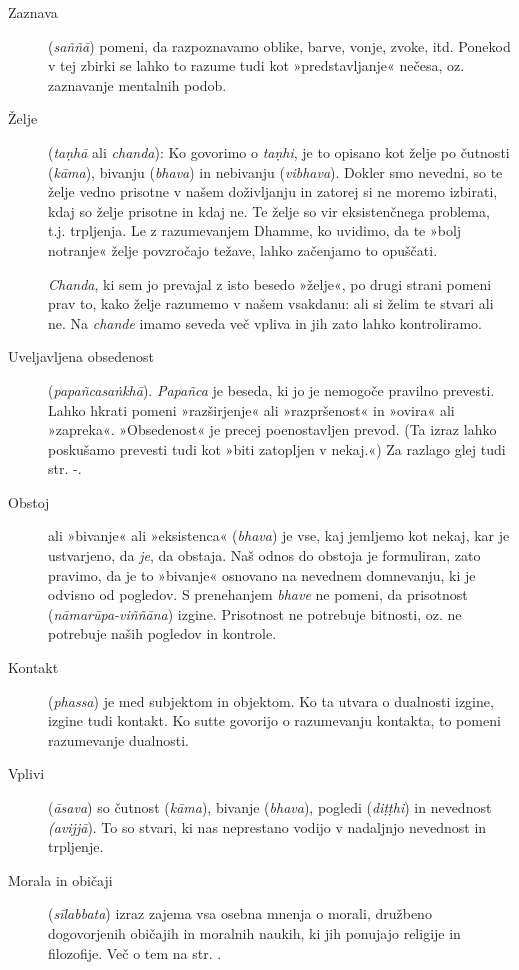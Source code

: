 \begin{description}
\item[Zaznava] (\emph{saññā}) pomeni, da razpoznavamo oblike, barve,
vonje, zvoke, itd. Ponekod v tej zbirki se lahko to razume tudi kot
»predstavljanje« nečesa, oz. zaznavanje mentalnih podob.

\item[Želje] (\emph{taṇhā} ali \emph{chanda}): Ko govorimo o
\emph{taṇhi}, je to opisano kot želje po čutnosti (\emph{kāma}), bivanju
(\emph{bhava}) in nebivanju (\emph{vibhava}). Dokler smo nevedni, so te
želje vedno prisotne v našem doživljanju in zatorej si ne moremo
izbirati, kdaj so želje prisotne in kdaj ne. Te želje so vir
eksistenčnega problema, t.j. trpljenja. Le z razumevanjem Dhamme, ko
uvidimo, da te »bolj notranje« želje povzročajo težave, lahko začenjamo
to opuščati.

\emph{Chanda}, ki sem jo prevajal z isto besedo »želje«, po drugi
strani pomeni prav to, kako želje razumemo v našem vsakdanu: ali si
želim te stvari ali ne. Na \emph{chande} imamo seveda več vpliva in jih
zato lahko kontroliramo.

\item[Uveljavljena obsedenost] (\emph{papañcasaṅkhā}).
\emph{Papañca} je beseda, ki jo je nemogoče pravilno prevesti. Lahko
hkrati pomeni »razširjenje« ali »razpršenost« in »ovira« ali »zapreka«.
»Obsedenost« je precej poenostavljen prevod. (Ta izraz lahko poskušamo
prevesti tudi kot »biti zatopljen v nekaj.«) Za razlago glej tudi str.
\pageref{vednostjo}-\pageref{vednostjo-end}.

\item[Obstoj] ali »bivanje« ali »eksistenca«
(\emph{bhava}) je vse, kaj jemljemo kot nekaj, kar je ustvarjeno, da
\emph{je}, da obstaja. Naš odnos do obstoja je formuliran, zato pravimo,
da je to »bivanje« osnovano na nevednem domnevanju, ki je odvisno od
pogledov. S prenehanjem \emph{bhave} ne pomeni, da prisotnost
(\emph{nāmarūpa-viññāna}) izgine. Prisotnost ne potrebuje bitnosti, oz.
ne potrebuje naših pogledov in kontrole.

\item[Kontakt] (\emph{phassa}) je med subjektom in objektom. Ko ta
utvara o dualnosti izgine, izgine tudi kontakt. Ko sutte govorijo o
razumevanju kontakta, to pomeni razumevanje dualnosti.

\item[Vplivi] (\emph{āsava}) so čutnost (\emph{kāma}), bivanje
(\emph{bhava}), pogledi (\emph{diṭṭhi}) in nevednost \emph{(avijjā}). To
so stvari, ki nas neprestano vodijo v nadaljnjo nevednost in trpljenje.

\item[Morala in običaji] (\emph{sīlabbata}) izraz zajema vsa osebna
mnenja o morali, družbeno dogovorjenih običajih in moralnih naukih, ki
jih ponujajo religije in filozofije. Več o tem na str.
\pageref{silabbata}.

\end{description}

